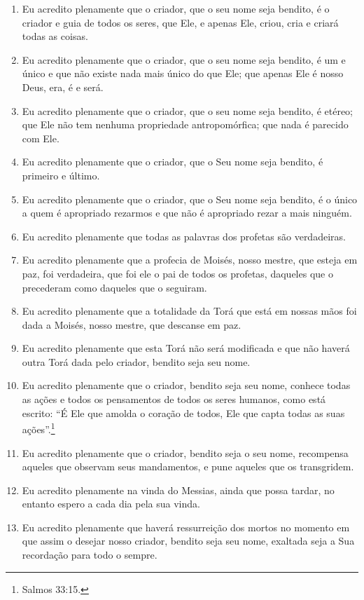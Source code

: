 \begin{enumerate}
\def\labelenumi{\arabic{enumi}.}
\item
  Eu acredito plenamente que o criador, que o seu nome seja bendito, é o
  criador e guia de todos os seres, que Ele, e apenas Ele, criou, cria e
  criará todas as coisas.

\item
  Eu acredito plenamente que o criador, que o seu nome seja bendito, é
  um e único e que não existe nada mais único do que Ele; que apenas Ele
  é nosso Deus, era, é e será.

\item
  Eu acredito plenamente que o criador, que o seu nome seja bendito, é
  etéreo; que Ele não tem nenhuma propriedade antropomórfica; que nada
  é parecido com Ele.

\item
  Eu acredito plenamente que o criador, que o Seu nome seja bendito, é
  primeiro e último.

\item
  Eu acredito plenamente que o criador, que o Seu nome seja bendito, é o
  único a quem é apropriado rezarmos e que não é apropriado rezar a mais
  ninguém.

\item
  Eu acredito plenamente que todas as palavras dos profetas são
  verdadeiras.

\item
  Eu acredito plenamente que a profecia de Moisés, nosso mestre, que
  esteja em paz, foi verdadeira, que foi ele o pai de todos os profetas,
  daqueles que o precederam como daqueles que o seguiram.

\item
  Eu acredito plenamente que a totalidade da Torá que está em
  nossas mãos foi dada a Moisés, nosso mestre, que descanse em paz.

\item
  Eu acredito plenamente que esta Torá não será modificada e que
  não haverá outra Torá dada pelo criador, bendito seja seu
  nome.

\item
  Eu acredito plenamente que o criador, bendito seja seu nome, conhece
  todas as ações e todos os pensamentos de todos os seres humanos, como
  está escrito: ``É Ele que amolda o coração de todos, Ele que capta
  todas as suas ações''.\footnote{Salmos 33:15.}

\item
  Eu acredito plenamente que o criador, bendito seja o seu nome,
  recompensa aqueles que observam seus mandamentos, e pune aqueles que
  os transgridem.

\item
  Eu acredito plenamente na vinda do Messias, ainda que possa tardar, no
  entanto espero a cada dia pela sua vinda.

\item
  Eu acredito plenamente que haverá ressurreição dos mortos no momento
  em que assim o desejar nosso criador, bendito seja seu nome, exaltada
  seja a Sua recordação para todo o sempre.
\end{enumerate}

